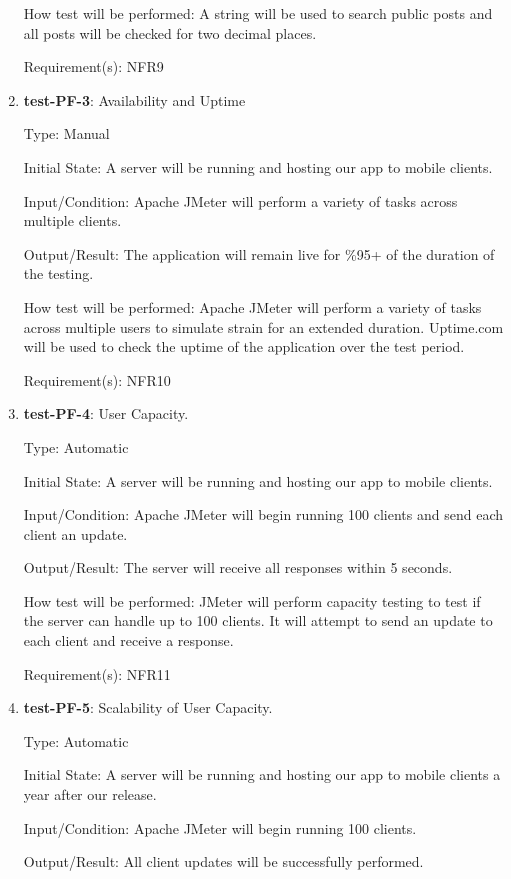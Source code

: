 \documentclass[12pt, titlepage]{article}
\begin{document}
\begin{enumerate}
		How test will be performed: A string will be used to search public posts and all posts will be checked for two decimal places.
		
		Requirement(s): NFR9
		
		\item{\textbf{test-PF-3}}: Availability and Uptime
		
		Type: Manual
		
		Initial State: A server will be running and hosting our app to mobile clients.
		
		Input/Condition: Apache JMeter will perform a variety of tasks across multiple clients.
		
		Output/Result: The application will remain live for \%95+ of the duration of the testing.
		
		How test will be performed: Apache JMeter will perform a variety of tasks across multiple users to simulate strain for an extended duration. Uptime.com will be used to check the uptime of the application over the test period.
		
		Requirement(s): NFR10
		
		\item{\textbf{test-PF-4}}: User Capacity.
		
		Type: Automatic
		
		Initial State: A server will be running and hosting our app to mobile clients.
		
		Input/Condition: Apache JMeter will begin running 100 clients and send each client an update.
		
		Output/Result: The server will receive all responses within 5 seconds.
		
		How test will be performed: JMeter will perform capacity testing to test if the server can handle up to 100 clients. It will attempt to send an update to each client and receive a response.
		
		Requirement(s): NFR11
		
		\item{\textbf{test-PF-5}}: Scalability of User Capacity.
		
		Type: Automatic
		
		Initial State: A server will be running and hosting our app to mobile clients a year after our release.
		
		Input/Condition: Apache JMeter will begin running 100 clients.
		
		Output/Result: All client updates will be successfully performed.
		

\end{enumerate}
\end{document}
